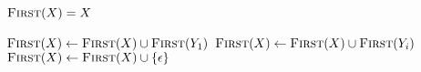 
\begin{algorithm}[H]
\begin{algorithmic}[1]
      
      \State $\textsc{First}(X) = X$
    \EndIf

    \hStatex
     
      \State $\textsc{First}(X) \gets \textsc{First}(X) \cup \textsc{First}(Y_{1})$
            \State $\textsc{First}(X) \gets \textsc{First}(X) \cup \textsc{First}(Y_{i})$
          \EndIf
      \EndFor
       
        \State $\textsc{First}(X) \gets \textsc{First}(X) \cup \{\epsilon\}$
      \EndIf
    \EndFor
  \EndProcedure
\end{algorithmic}
\end{algorithm}